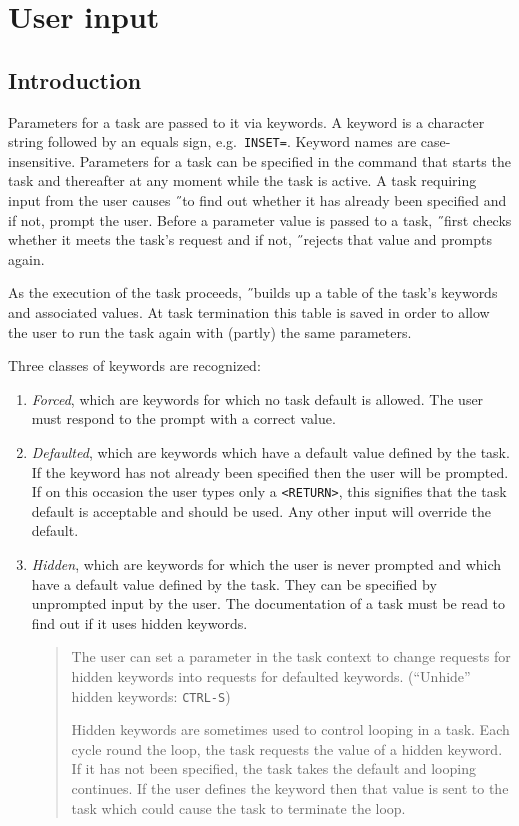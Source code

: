 \section{User input}
\subsection{Introduction}
Parameters for a task are passed to it via keywords.
A keyword is a character string followed by an equals sign, e.g.\ {\tt INSET=}.
Keyword names are case-insensitive.
Parameters for a task can be specified in the command that starts the task and
thereafter at any moment while the task is active.
A task requiring input from the user causes \H\ to find out whether it has
already been specified and if not, prompt the user.
Before a parameter value is passed to a task, \H\ first checks whether it
meets the task's request and if not, \H\ rejects that value and prompts again.

As the execution of the task
proceeds, \H\ builds up a table of the task's keywords and associated
values.
At task termination this table is saved in order to allow the user to
run the task again with (partly) the same parameters.  

Three classes of keywords are recognized:
\begin{enumerate}
\item
{\em Forced\/}, which are keywords for which no task default is allowed.
The user must respond to the prompt with a correct value.
\item
{\em Defaulted\/},
which are keywords which have a default value defined by the
task. If the keyword has not already been specified then the user
will be prompted.
If on this occasion the user types only a {\tt <RETURN>}, this
signifies that the task default is acceptable and should be used. Any
other input will override the default.
\item
{\em Hidden\/},
which are keywords for which the user is never prompted and
which have a default value defined by the task.
They can be specified by unprompted input by the user.
The documentation of a task must be read to find out if it uses
hidden keywords.
\begin{quote}
\small The user can set a parameter in the task context to change requests
for hidden keywords into requests for defaulted keywords. (``Unhide'' hidden
keywords: {\tt CTRL-S})

Hidden keywords are sometimes used to control looping in a task.
Each cycle round the loop, the task requests the value of a hidden keyword.
If it has not been specified, the task takes the default and looping continues.
If the user defines the keyword then that value is sent to the task which 
could cause the task to terminate the loop.
\end{quote}
\end{enumerate}

